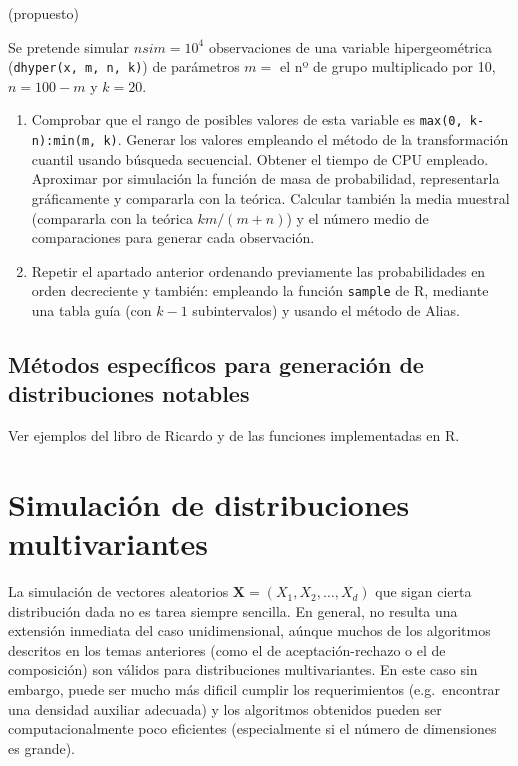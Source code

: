 \documentclass[
]{book}
\theoremstyle{break}
\theoremstyle{definition}
\theoremstyle{definition}
\theoremstyle{definition}
\theoremstyle{remark}
\let\BeginKnitrBlock\begin \let\EndKnitrBlock\end
\begin{document}
\BeginKnitrBlock{exercise}
\protect\hypertarget{exr:unnamed-chunk-34}{}{\label{exr:unnamed-chunk-34} }(propuesto)
\EndKnitrBlock{exercise}

Se pretende simular \(nsim=10^{4}\) observaciones de una variable
hipergeométrica (\texttt{dhyper(x,\ m,\ n,\ k)}) de parámetros \(m=\) el nº
de grupo multiplicado por 10, \(n=100-m\) y \(k=20\).

\begin{enumerate}
\def\labelenumi{\alph{enumi})}
\item
  Comprobar que el rango de posibles valores de esta variable es
  \texttt{max(0,\ k-n):min(m,\ k)}. Generar los valores empleando el método
  de la transformación cuantil usando búsqueda secuencial. Obtener
  el tiempo de CPU empleado. Aproximar por simulación la función
  de masa de probabilidad, representarla gráficamente y compararla
  con la teórica. Calcular también la media muestral (compararla
  con la teórica \(km/(m+n)\)) y el número medio de comparaciones
  para generar cada observación.
\item
  Repetir el apartado anterior ordenando previamente las
  probabilidades en orden decreciente y también: empleando la
  función \texttt{sample} de R, mediante una tabla guía (con
  \(k-1\) subintervalos) y usando el método de Alias.
\end{enumerate}

\hypertarget{muxe9todos-especuxedficos-para-generaciuxf3n-de-distribuciones-notables}{%
\section{Métodos específicos para generación de distribuciones notables}\label{muxe9todos-especuxedficos-para-generaciuxf3n-de-distribuciones-notables}}

Ver ejemplos del libro de Ricardo
y de las funciones implementadas en R.

\hypertarget{simulaciuxf3n-de-distribuciones-multivariantes}{%
\chapter{Simulación de distribuciones multivariantes}\label{simulaciuxf3n-de-distribuciones-multivariantes}}

La simulación de vectores aleatorios \(\mathbf{X} =\left( X_1,X_2,\ldots,X_d\right)\) que sigan cierta distribución dada no es tarea siempre sencilla.
En general, no resulta una extensión inmediata del caso unidimensional,
aúnque muchos de los algoritmos descritos en los temas anteriores (como el de aceptación-rechazo o el de composición) son válidos para distribuciones multivariantes.
En este caso sin embargo, puede ser mucho más dificil cumplir los requerimientos (e.g.~encontrar una densidad auxiliar adecuada) y los algoritmos obtenidos pueden ser computacionalmente poco eficientes (especialmente si el número de dimensiones es grande).
\end{document}
